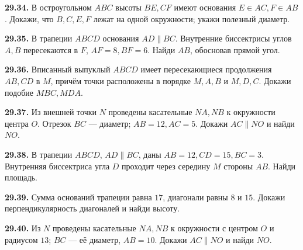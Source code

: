 \noindent\begin{minipage}[t]{\linewidth}\textbf{29.34.}\starmark{} В остроугольном \(ABC\) высоты \(BE,CF\) имеют основания \(E\in AC,F\in AB\). Докажи, что \(B,C,E,F\) лежат на одной окружности; укажи полезный диаметр.\par\end{minipage}\par
\noindent\begin{minipage}[t]{\linewidth}\textbf{29.35.} В трапеции \(ABCD\) основания \(AD\parallel BC\). Внутренние биссектрисы углов \(A,B\) пересекаются в \(F\), \(AF=8,BF=6\). Найди \(AB\), обосновав прямой угол.\par\end{minipage}\par
\noindent\begin{minipage}[t]{\linewidth}\textbf{29.36.}\starmark{} Вписанный выпуклый \(ABCD\) имеет пересекающиеся продолжения \(AB,CD\) в \(M\), причём точки расположены в порядке \(M,A,B\) и \(M,D,C\). Докажи подобие \(MBC,MDA\).\par\end{minipage}\par
\noindent\begin{minipage}[t]{\linewidth}\textbf{29.37.}\starmark{} Из внешней точки \(N\) проведены касательные \(NA,NB\) к окружности центра \(O\). Отрезок \(BC\) — диаметр; \(AB=12,AC=5\). Докажи \(AC\parallel NO\) и найди \(NO\).\par\end{minipage}\par
\noindent\begin{minipage}[t]{\linewidth}\textbf{29.38.}\starmark{} В трапеции \(ABCD\), \(AD\parallel BC\), даны \(AB=12,CD=15,BC=3\). Внутренняя биссектриса угла \(D\) проходит через середину \(M\) стороны \(AB\). Найди площадь.\par\end{minipage}\par
\noindent\begin{minipage}[t]{\linewidth}\textbf{29.39.}\starmark{} Сумма оснований трапеции равна \(17\), диагонали равны \(8\) и \(15\). Докажи перпендикулярность диагоналей и найди высоту.\par\end{minipage}\par
\noindent\begin{minipage}[t]{\linewidth}\textbf{29.40.}\starmark{} Из \(N\) проведены касательные \(NA,NB\) к окружности с центром \(O\) и радиусом \(13\); \(BC\) — её диаметр, \(AB=10\). Докажи \(AC\parallel NO\) и найди \(NO\).\par\end{minipage}\par
